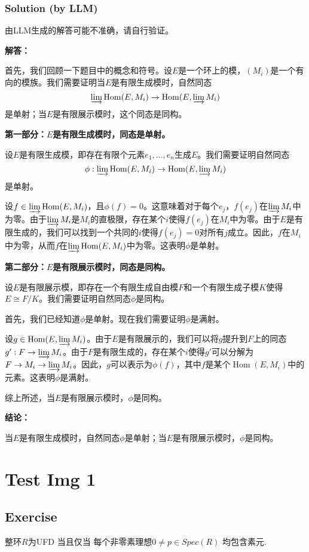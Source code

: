 \documentclass[12pt]{book}
\begin{document}
\subsection*{Solution (by LLM)}
由LLM生成的解答可能不准确，请自行验证。

\textbf{解答：}

首先，我们回顾一下题目中的概念和符号。设$E$是一个环上的模，$(M_i)$是一个有向的模族。我们需要证明当$E$是有限生成模时，自然同态
\[
\varinjlim \operatorname{Hom}(E, M_i) \to \operatorname{Hom}(E, \varinjlim M_i)
\]
是单射；当$E$是有限展示模时，这个同态是同构。

\textbf{第一部分：$E$是有限生成模时，同态是单射。}

设$E$是有限生成模，即存在有限个元素$e_1, \ldots, e_n$生成$E$。我们需要证明自然同态
\[
\phi: \varinjlim \operatorname{Hom}(E, M_i) \to \operatorname{Hom}(E, \varinjlim M_i)
\]
是单射。

设$f \in \varinjlim \operatorname{Hom}(E, M_i)$，且$\phi(f) = 0$。这意味着对于每个$e_j$，$f(e_j)$在$\varinjlim M_i$中为零。由于$\varinjlim M_i$是$M_i$的直极限，存在某个$i$使得$f(e_j)$在$M_i$中为零。由于$E$是有限生成的，我们可以找到一个共同的$i$使得$f(e_j) = 0$对所有$j$成立。因此，$f$在$M_i$中为零，从而$f$在$\varinjlim \operatorname{Hom}(E, M_i)$中为零。这表明$\phi$是单射。

\textbf{第二部分：$E$是有限展示模时，同态是同构。}

设$E$是有限展示模，即存在一个有限生成自由模$F$和一个有限生成子模$K$使得$E \cong F/K$。我们需要证明自然同态$\phi$是同构。

首先，我们已经知道$\phi$是单射。现在我们需要证明$\phi$是满射。

设$g \in \operatorname{Hom}(E, \varinjlim M_i)$。由于$E$是有限展示的，我们可以将$g$提升到$F$上的同态$g': F \to \varinjlim M_i$。由于$F$是有限生成的，存在某个$i$使得$g'$可以分解为$F \to M_i \to \varinjlim M_i$。因此，$g$可以表示为$\phi(f)$，其中$f$是某个$\operatorname{Hom}(E, M_i)$中的元素。这表明$\phi$是满射。

综上所述，当$E$是有限展示模时，$\phi$是同构。

\textbf{结论：}

当$E$是有限生成模时，自然同态$\phi$是单射；当$E$是有限展示模时，$\phi$是同构。
\newpage
\chapter{Test Img 1}
\section*{Exercise}
整环$R$为UFD 当且仅当 每个非零素理想$0 \neq p \in Spec(R)$ 均包含素元.
\end{document}
